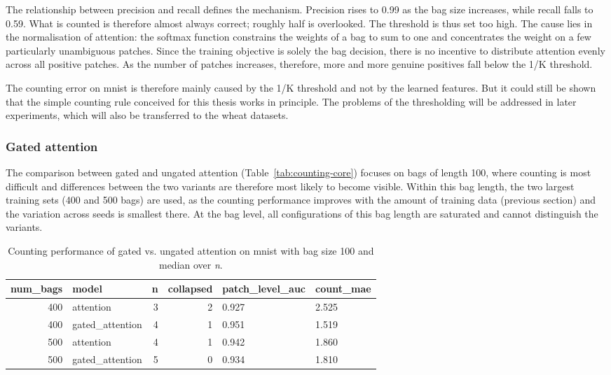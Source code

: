 \documentclass[12pt,parskip = half, DIV=classic,listof=totoc]{scrartcl}
\begin{document}
			The relationship between precision and recall defines the mechanism. Precision rises to 0.99 as the bag size increases, 
			while recall falls to 0.59. What is counted is therefore almost always correct; roughly half is overlooked. The
			threshold is thus set too high. The cause lies in the normalisation of attention: the softmax function constrains the weights of a 
			bag to sum to one and concentrates the weight on a few particularly unambiguous patches. Since the
			training objective is solely the bag decision, there is no incentive to distribute attention evenly across all positive patches. As
			the number of patches increases, therefore, more and more genuine positives fall below the 1/K threshold.

			The counting error on \ac{mnist} is therefore mainly caused by the 1/K threshold and not by the learned features.
			 But it could still be shown that the simple counting rule conceived for this 
			thesis works in principle. The problems of the thresholding will be addressed in later experiments, which will also be transferred to the wheat datasets.

		\subsubsection{Gated attention}\label{sec:minst_gated}
			The comparison between gated and ungated attention (Table~\ref{tab:counting-core}) focuses on bags of length 100, where counting is most difficult 
			and differences between the two variants are therefore most likely to become visible. Within this bag 
			length, the two largest training sets (400 and 500 bags) are used, as the counting performance improves with the 
			amount of training data (previous section) and the variation across seeds is smallest there. At the bag level, all 
			configurations of this bag length are saturated and cannot distinguish the variants.

			\begin{table}[htbp]
				\centering
				\small
				\begin{tabular}{rlrrll}
					\toprule
					num\_bags & model & n & collapsed & patch\_level\_auc & count\_mae \\
					\midrule
					400 & attention & 3 & 2 & 0.927 & 2.525 \\
					400 & gated\_attention & 4 & 1 & 0.951 & 1.519 \\
					\midrule
					500 & attention & 4 & 1 & 0.942 & 1.860 \\
					500 & gated\_attention & 5 & 0 & 0.934 & 1.810 \\
					\bottomrule
				\end{tabular}
				\caption[Counting performance of gated vs. ungated attention on \acs*{mnist}]{Counting performance of gated vs. 
						ungated attention on \ac{mnist} with bag size 100 and median over \emph{n}.}				
				\label{tab:mnist-gated}
			\end{table}
\end{document}
